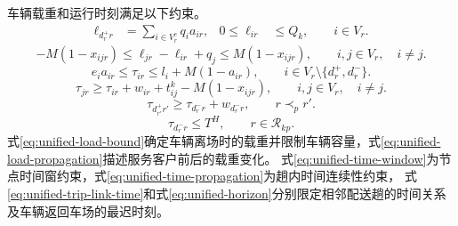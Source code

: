 \documentclass{setp-new}
\begin{document}
车辆载重和运行时刻满足以下约束。
\begin{equation}
\begin{aligned}
\ell_{d_r^{+}r}&=\sum_{i\in V_r^{c}}q_i a_{ir}, &
0\le\ell_{ir}&\le Q_k,\qquad i\in V_r .
\end{aligned}
\label{eq:unified-load-bound}
\end{equation}
\begin{equation}
-M(1-x_{ijr})
\le\ell_{jr}-\ell_{ir}+q_j
\le M(1-x_{ijr}),
\qquad i,j\in V_r,\quad i\ne j .
\label{eq:unified-load-propagation}
\end{equation}
\begin{equation}
e_i a_{ir}
\le\tau_{ir}\le l_i+M(1-a_{ir}),
\qquad i\in V_r\setminus\{d_r^{+},d_r^{-}\}.
\label{eq:unified-time-window}
\end{equation}
\begin{equation}
\tau_{jr}
\ge\tau_{ir}+w_{ir}+t_{ij}^{k}-M(1-x_{ijr}),
\qquad i,j\in V_r,\quad i\ne j .
\label{eq:unified-time-propagation}
\end{equation}
\begin{equation}
\tau_{d_{r'}^{+}r'}
\ge\tau_{d_r^{-}r}+w_{d_r^{-}r},
\qquad r\prec_p r' .
\label{eq:unified-trip-link-time}
\end{equation}
\begin{equation}
\tau_{d_r^{-}r}\le T^{H},
\qquad r\in\mathcal R_{kp}.
\label{eq:unified-horizon}
\end{equation}
式\eqref{eq:unified-load-bound}确定车辆离场时的载重并限制车辆容量，式\eqref{eq:unified-load-propagation}描述服务客户前后的载重变化。
式\eqref{eq:unified-time-window}为节点时间窗约束，式\eqref{eq:unified-time-propagation}为趟内时间连续性约束，
式\eqref{eq:unified-trip-link-time}和式\eqref{eq:unified-horizon}分别限定相邻配送趟的时间关系及车辆返回车场的最迟时刻。
\end{document}
